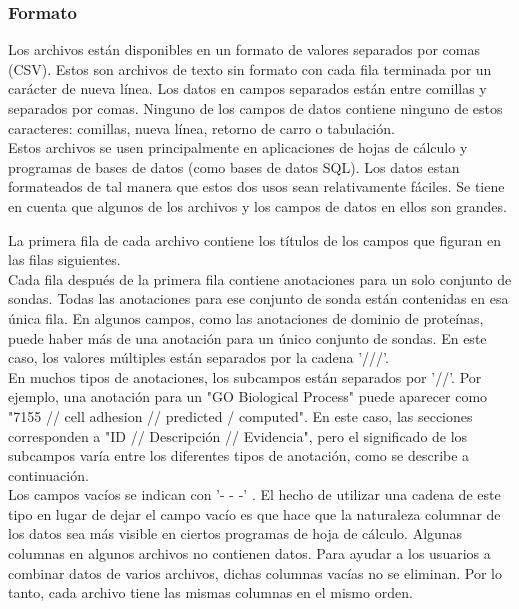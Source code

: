 \documentclass[12pt,letterpaper]{article}
\begin{document}
\subsubsection{Formato}

Los archivos están disponibles en un formato de valores separados por comas (CSV). Estos son archivos de texto sin formato con cada fila terminada por un carácter de nueva línea. Los datos en campos separados están entre comillas y separados por comas. Ninguno de los campos de datos contiene ninguno de estos caracteres: comillas, nueva línea, retorno de carro o tabulación.\\

Estos archivos se usen principalmente en aplicaciones de hojas de cálculo y programas de bases de datos (como bases de datos SQL). Los datos estan formateados de tal manera que estos dos usos sean relativamente fáciles. Se tiene en cuenta que algunos de los archivos y los campos de datos en ellos son grandes. 

La primera fila de cada archivo contiene los títulos de los campos que figuran en las filas siguientes.\\

Cada fila después de la primera fila contiene anotaciones para un solo conjunto de sondas. Todas las anotaciones para ese conjunto de sonda están contenidas en esa única fila. En algunos campos, como las anotaciones de dominio de proteínas, puede haber más de una anotación para un único conjunto de sondas. En este caso, los valores múltiples están separados por la cadena '///'.\\

En muchos tipos de anotaciones, los subcampos están separados por '//'. Por ejemplo,  una anotación para un "GO Biological Process" puede aparecer como "7155 // cell adhesion // predicted / computed".  En este caso, las secciones corresponden a "ID // Descripción // Evidencia", pero el significado de los subcampos varía entre los diferentes tipos de anotación, como se describe a continuación.\\

Los campos vacíos se indican con '- - -' . El hecho de utilizar una cadena de este tipo en lugar de dejar el campo vacío es que hace que la naturaleza columnar de los datos sea más visible en ciertos programas de hoja de cálculo.
Algunas columnas en algunos archivos no contienen datos. Para ayudar a los usuarios a combinar datos de varios archivos, dichas columnas vacías no se eliminan. Por lo tanto, cada archivo tiene las mismas columnas en el mismo orden.\\
\end{document}
